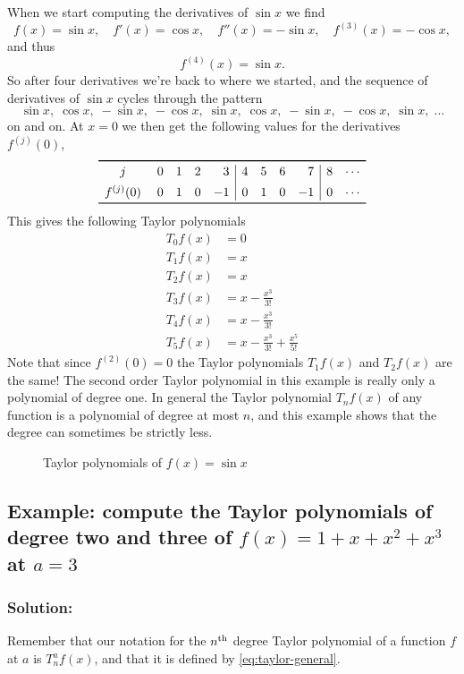 When we start computing the derivatives of $\sin x$ we find
\[
f (x)=\sin x,\quad f' (x)=\cos x, \quad f'' (x)=-\sin x, \quad f^{(3)} (x)
= -\cos x,
\]
and thus
\[
f^{(4)}(x) = \sin x.
\]
So after four derivatives we're back to where we started, and the
sequence of derivatives of $\sin x$ cycles through the pattern
\[
\sin x,\; \cos x,\; -\sin x,\; -\cos x,\; \sin x,\; \cos x,\; -\sin x,\;
-\cos x,\; \sin x,\; \ldots
\]
on and on. At $x=0$ we then get the following values for the derivatives
$f^{(j)} (0)$,
\[
  \begin{array}{crrrr|rrrr|rc}
    \toprule
    j\;  &0 & 1 & 2 & 3 & 4 & 5 & 6 & 7 & 8&\cdots \\[1ex]
    f^{(j)} (0)\; & 0 & 1 & 0 & -1& 0 & 1 & 0 & -1&0&\cdots\\
    \bottomrule
  \end{array}
\]
This gives the following Taylor polynomials
\begin{align*}
  T_0f(x) & = 0 \\
  T_1f(x) & = x \\
  T_2f(x) & = x \\
  T_3f(x) & = x-\frac{x^3}{3!} \\
  T_4f(x) & = x-\frac{x^3}{3!} \\
  T_5f(x) & = x-\frac{x^3}{3!}+\frac{x^5}{5!}
\end{align*}
Note that since $f^{(2)}(0)=0$ the Taylor polynomials $T_1f (x)$ and $T_2f
(x)$ are the same! The second order Taylor polynomial in this example is
really only a polynomial of degree one. In general the Taylor polynomial
$T_nf(x)$ of any function is a polynomial of degree at most $n$, and this
example shows that the degree can sometimes be strictly less.

\bigskip
\begin{figure}[ht]
  \centering 
  \caption{Taylor polynomials of $f (x)=\sin x$}
  \label{fig:sin-taylor}
\end{figure}


\subsection{Example: compute the Taylor polynomials of degree two and %
three of $f(x) = 1+x+x^2+x^3$ at $a=3$}

\subsubsection*{Solution: } Remember that our notation for the $n^{\rm th}$ degree
Taylor polynomial of a function $f$ at $a$ is $T_n^af(x)$, and that it is
defined by \eqref{eq:taylor-general}.

